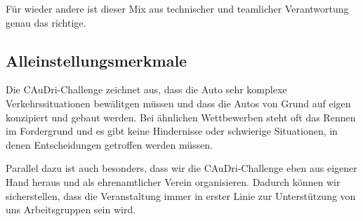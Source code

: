 Für wieder andere ist dieser Mix aus technischer und teamlicher Verantwortung
genau das richtige.

\subsection{Alleinstellungsmerkmale}
Die CAuDri-Challenge zeichnet aus, dass die Auto sehr komplexe Verkehrssituationen
bewälitgen müssen und dass die Autos von Grund auf eigen konzipiert und gebaut werden.
Bei ähnlichen Wettbewerben steht oft das Rennen im Fordergrund und es gibt keine Hindernisse
oder schwierige Situationen, in denen Entscheidungen getroffen werden müssen.

Parallel dazu ist auch besonders, dass wir die CAuDri-Challenge eben aus eigener
Hand heraus und als ehrenamtlicher Verein organisieren. Dadurch können wir sicherstellen,
dass die Veranstaltung immer in erster Linie zur Unterstützung von uns Arbeitsgruppen
sein wird.

